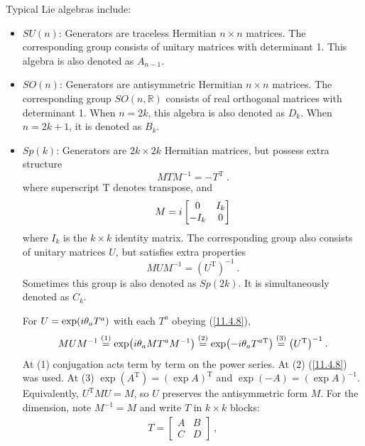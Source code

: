 Typical Lie algebras include:
\begin{itemize}
	\item $SU(n)$: Generators are traceless Hermitian $n\times n$ matrices. The corresponding group consists of unitary matrices with determinant 1. This algebra is also denoted as $A_{n-1}$.
	\item $SO(n)$: Generators are antisymmetric Hermitian $n\times n$ matrices. The corresponding group $SO(n,\mathds{R})$ consists of real orthogonal matrices with determinant 1. When $n=2k$, this algebra is also denoted as $D_{k}$. When $n=2k+1$, it is denoted as $B_{k}$.
	\item $Sp(k)$: Generators are $2k\times 2k$ Hermitian matrices, but possess extra structure
	\begin{equation}
		M T M^{-1} = - T^{\mathrm{T}} \:. \label{11.4.8}
	\end{equation}
	where superscript $\mathrm{T}$ denotes transpose, and
	\begin{equation}
		M = i \begin{bmatrix}
			0 & I_{k} \\ -I_{k} & 0 
		\end{bmatrix} \label{11.4.9}
	\end{equation}
	where $I_{k}$ is the $k\times k$ identity matrix. The corresponding group also consists of unitary matrices $U$, but satisfies extra properties
	\begin{equation}
		M U M^{-1} = (U^{\mathrm{T}})^{-1} \:. \label{11.4.10}
	\end{equation}
	Sometimes this group is also denoted as $Sp(2k)$. It is simultaneously denoted as $C_{k}$.
	\begin{tcolorbox}[breakable]
		\begin{remark}
			For $U=\exp(i\theta_{a}T^{a})$ with each $T^{a}$ obeying (\ref{11.4.8}),
			\begin{equation*}
				MUM^{-1}\overset{(1)}{=}\exp\bigl(i\theta_{a}MT^{a}M^{-1}\bigr)\overset{(2)}{=}\exp\bigl(-i\theta_{a}T^{a\mathrm{T}}\bigr)\overset{(3)}{=}\bigl(U^{\mathrm{T}}\bigr)^{-1}\:.
			\end{equation*}
			At (1) conjugation acts term by term on the power series. At (2) (\ref{11.4.8}) was used. At (3) $\exp(A^{\mathrm{T}})=(\exp A)^{\mathrm{T}}$ and $\exp(-A)=(\exp A)^{-1}$. Equivalently, $U^{\mathrm{T}}MU=M$, so $U$ preserves the antisymmetric form $M$. For the dimension, note $M^{-1}=M$ and write $T$ in $k\times k$ blocks:
			\begin{gather*}
				T=\begin{bmatrix}A&B\\C&D\end{bmatrix}\:,\qquad

\end{gather*}
\end{remark}
\end{tcolorbox}
\end{itemize}
